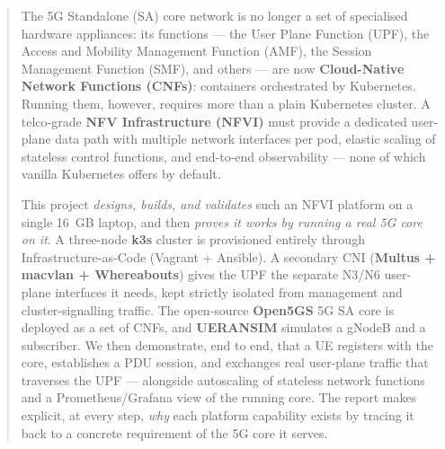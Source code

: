 \documentclass[12pt]{article}
\begin{document}
\newpage
\begin{abstract}
\large
The 5G Standalone (SA) core network is no longer a set of specialised
hardware appliances: its functions --- the User Plane Function (UPF), the
Access and Mobility Management Function (AMF), the Session Management
Function (SMF), and others --- are now \textbf{Cloud-Native Network
Functions (CNFs)}: containers orchestrated by Kubernetes. Running them,
however, requires more than a plain Kubernetes cluster. A telco-grade
\textbf{NFV Infrastructure (NFVI)} must provide a dedicated user-plane data
path with multiple network interfaces per pod, elastic scaling of stateless
control functions, and end-to-end observability --- none of which vanilla
Kubernetes offers by default.
\par
This project \emph{designs, builds, and validates} such an NFVI platform on a
single 16~GB laptop, and then \emph{proves it works by running a real 5G core
on it}. A three-node \textbf{k3s} cluster is provisioned entirely through
Infrastructure-as-Code (Vagrant + Ansible). A secondary CNI
(\textbf{Multus + macvlan + Whereabouts}) gives the UPF the separate
N3/N6 user-plane interfaces it needs, kept strictly isolated from management
and cluster-signalling traffic. The open-source \textbf{Open5GS} 5G SA core is
deployed as a set of CNFs, and \textbf{UERANSIM} simulates a gNodeB and a
subscriber. We then demonstrate, end to end, that a UE registers with the
core, establishes a PDU session, and exchanges real user-plane traffic that
traverses the UPF --- alongside autoscaling of stateless network functions and
a Prometheus/Grafana view of the running core. The report makes explicit, at
every step, \emph{why} each platform capability exists by tracing it back to a
concrete requirement of the 5G core it serves.
\end{abstract}

\newpage
\tableofcontents
\newpage








\end{document}
